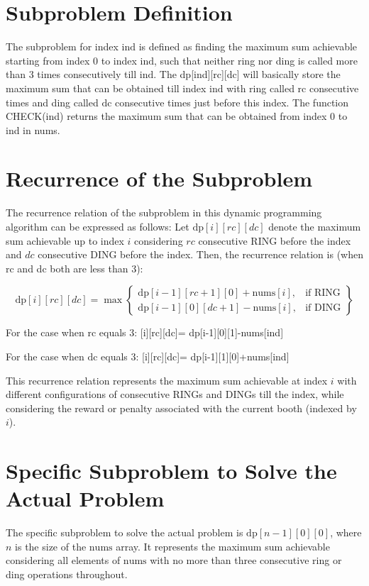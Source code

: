 \documentclass{article}
\begin{document}
\section{Subproblem Definition}
    The subproblem for index $\text{ind}$ is defined as finding the maximum sum achievable starting from index $\text{0}$ to index $\text{ind}$, such that neither ring nor ding is called more than $\text{3}$ times consecutively till $\text{ind}$. The dp[ind][rc][dc] will basically store the maximum sum that can be obtained till index $\text{ind}$ with ring called $\text{rc}$ consecutive times and ding called $\text{dc}$ consecutive times just before this index. The function CHECK(ind) returns the maximum sum that can be obtained from index 0 to ind in nums.


\section{Recurrence of the Subproblem}

    The recurrence relation of the subproblem in this dynamic programming algorithm can be expressed as follows:
    Let $\text{dp}[i][rc][dc]$ denote the maximum sum achievable up to index $i$ considering $rc$ consecutive RING before the index and $dc$ consecutive DING before the index. Then, the recurrence relation is (when rc and dc both are less than 3):

    \begin{equation*}
    \text{dp}[i][rc][dc] = \max \left\{
        \begin{array}{ll}
            \text{dp}[i-1][rc+1][0] + \text{nums}[i], & \text{if } \text{RING} \\
            \text{dp}[i-1][0][dc+1] - \text{nums}[i], & \text{if } \text{DING}
        \end{array}
    \right\}
    \end{equation*}

    For the case when $\text{rc}$ equals $\text{3}$:
    [i][rc][dc]= dp[i-1][0][1]-nums[ind]
    
    For the case when $\text{dc}$ equals $\text{3}$:
    [i][rc][dc]= dp[i-1][1][0]+nums[ind]

    This recurrence relation represents the maximum sum achievable at index $i$ with different configurations of consecutive RINGs and DINGs till the index, while considering the reward or penalty associated with the current booth (indexed by $i$).


\section{Specific Subproblem to Solve the Actual Problem}
    The specific subproblem to solve the actual problem is $\text{dp}[n-1][0][0]$, where $n$ is the size of the $\text{nums}$ array. It represents the maximum sum achievable considering all elements of $\text{nums}$ with no more than three consecutive ring or ding operations throughout.
\end{document}

